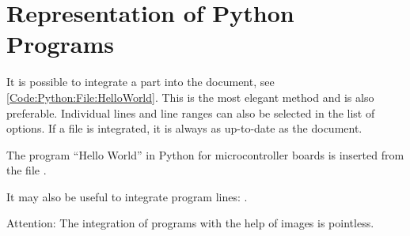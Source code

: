 %
%

\chapter{Representation of Python Programs}


It is possible to integrate a part into the document, see \ref{Code:Python:File:HelloWorld}. This is the most elegant method and is also preferable. Individual lines and line ranges can also be selected in the list of options. If a file is integrated, it is always as up-to-date as the document.


\begin{code}
  \caption[\glqq Hello World\grqq{} in Python -- Variant 1]{The program ``Hello World'' in Python for microcontroller boards is inserted from the file .}\label{Code:Python:File:HelloWorld}    

    
\end{code}    

It may also be useful to integrate program lines: .


\bigskip

Attention: The integration of programs with the help of images is pointless.